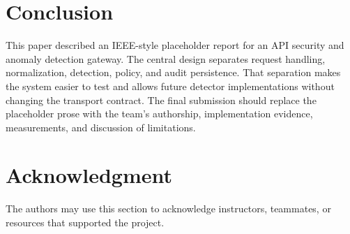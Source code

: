 \documentclass[conference]{IEEEtran}
\begin{document}
\section{Conclusion}
This paper described an IEEE-style placeholder report for an API security and
anomaly detection gateway. The central design separates request handling,
normalization, detection, policy, and audit persistence. That separation makes
the system easier to test and allows future detector implementations without
changing the transport contract. The final submission should replace the
placeholder prose with the team's authorship, implementation evidence,
measurements, and discussion of limitations.

\section*{Acknowledgment}
The authors may use this section to acknowledge instructors, teammates, or
resources that supported the project.



\end{document}
